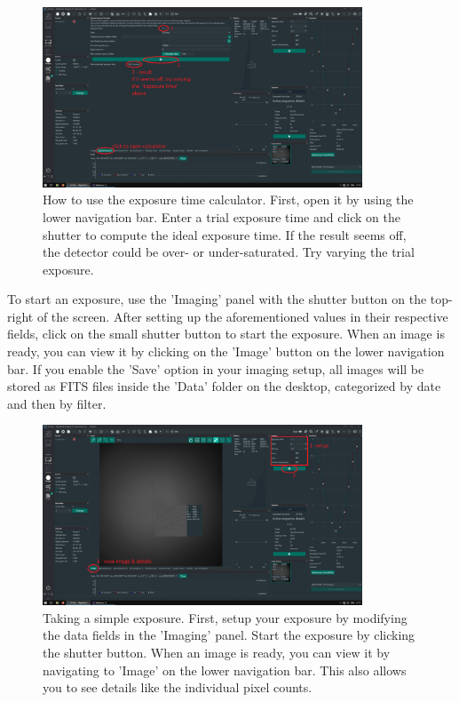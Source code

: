 \documentclass[a4paper, 11pt, fleqn]{memoir}
\begin{document}
\begin{figure}
    \centering
    \includegraphics[width=0.85\textwidth]{figures/NINA/ExposureCalculator.png}
    \caption{How to use the exposure time calculator. First, open it by using the lower navigation bar. Enter a trial exposure time and click on the shutter to compute the ideal exposure time. If the result seems off, the detector could be over- or under-saturated. Try varying the trial exposure.}
    \label{fig:NINA:ExposureCalculator}
\end{figure}

To start an exposure, use the 'Imaging' panel with the shutter button on the top-right of the screen. After setting up the aforementioned values in their respective fields, click on the small shutter button to start the exposure. When an image is ready, you can view it by clicking on the 'Image' button on the lower navigation bar. If you enable the 'Save' option in your imaging setup, all images will be stored as FITS files inside the 'Data' folder on the desktop, categorized by date and then by filter.

\begin{figure}
    \centering
    \includegraphics[width=0.85\textwidth]{figures/NINA/SingleExposure.png}
    \caption{Taking a simple exposure. First, setup your exposure by modifying the data fields in the 'Imaging' panel. Start the exposure by clicking the shutter button. When an image is ready, you can view it by navigating to 'Image' on the lower navigation bar. This also allows you to see details like the individual pixel counts.}
    \label{fig:NINA:SingleExposure}
\end{figure}
\end{document}
